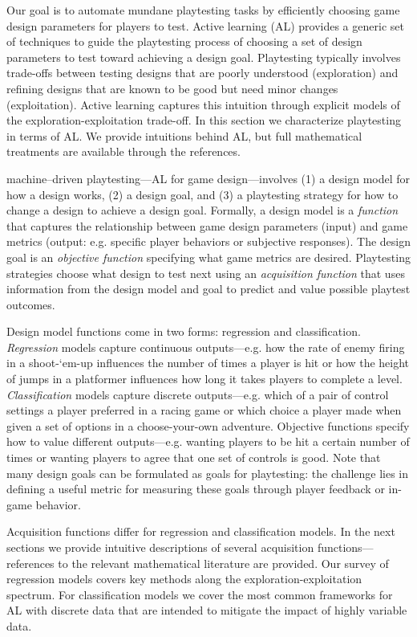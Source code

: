 \documentclass{sig-alternate}
\begin{document}
Our goal is to automate mundane playtesting tasks by efficiently choosing game design parameters for players to test.
Active learning (AL) provides a generic set of techniques to guide the playtesting process of choosing a set of design parameters to test toward achieving a design goal.
Playtesting typically involves trade-offs between testing designs that are poorly understood (exploration) and refining designs that are known to be good but need minor changes (exploitation).
Active learning captures this intuition through explicit models of the exploration-exploitation trade-off.
In this section we characterize playtesting in terms of AL.
We provide intuitions behind AL, but full mathematical treatments are available through the references.


machine--driven playtesting---AL for game design---involves (1) a design model for how a design works, (2) a design goal, and (3) a playtesting strategy for how to change a design to achieve a design goal.
Formally, a design model is a \textit{function} that captures the relationship between game design parameters (input) and game metrics (output: e.g. specific player behaviors or subjective responses).
The design goal is an \textit{objective function} specifying what game metrics are desired.
Playtesting strategies choose what design to test next using an \textit{acquisition function} that uses information from the design model and goal to predict and value possible playtest outcomes.

Design model functions come in two forms: regression and classification.
\textit{Regression} models capture continuous outputs---e.g. how the rate of enemy firing in a shoot-`em-up influences the number of times a player is hit or how the height of jumps in a platformer influences how long it takes players to complete a level.
\textit{Classification} models capture discrete outputs---e.g. which of a pair of control settings a player preferred in a racing game or which choice a player made when given a set of options in a choose-your-own adventure.
Objective functions specify how to value different outputs---e.g. wanting players to be hit a certain number of times or wanting players to agree that one set of controls is good.
Note that many design goals can be formulated as goals for playtesting: the challenge lies in defining a useful metric for measuring these goals through player feedback or in-game behavior.

Acquisition functions differ for regression and classification models.
In the next sections we provide intuitive descriptions of several acquisition functions---references to the relevant mathematical literature are provided.
Our survey of regression models covers key methods along the exploration-exploitation spectrum.
For classification models we cover the most common frameworks for AL with discrete data that are intended to mitigate the impact of highly variable data.
\end{document}
